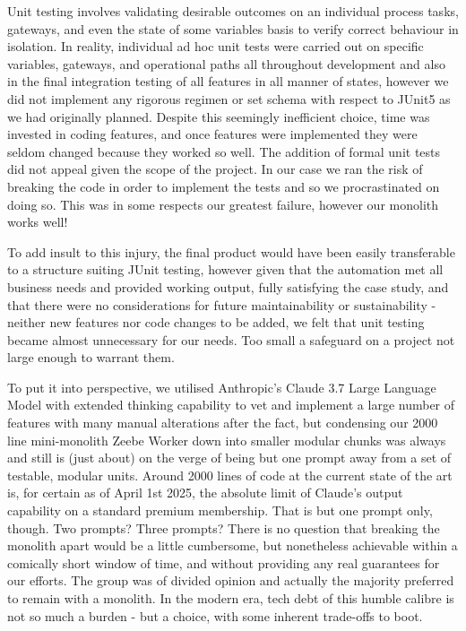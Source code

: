 \documentclass[14pt,a4paper]{article}
\begin{document}
Unit testing involves validating desirable outcomes on an individual process tasks, gateways, and even the state of some variables basis to verify correct behaviour in isolation. In reality, individual ad hoc unit tests were carried out on specific variables, gateways, and operational paths all throughout development and also in the final integration testing of all features in all manner of states, however we did not implement any rigorous regimen or set schema with respect to JUnit5 as we had originally planned. Despite this seemingly inefficient choice, time was invested in coding features, and once features were implemented they were seldom changed because they worked so well. The addition of formal unit tests did not appeal given the scope of the project. In our case we ran the risk of breaking the code in order to implement the tests and so we procrastinated on doing so. This was in some respects our greatest failure, however our monolith works well!

To add insult to this injury, the final product would have been easily transferable to a structure suiting JUnit testing, however given that the automation met all business needs and provided working output, fully satisfying the case study, and that there were no considerations for future maintainability or sustainability - neither new features nor code changes to be added, we felt that unit testing became almost unnecessary for our needs. Too small a safeguard on a project not large enough to warrant them.

To put it into perspective, we utilised Anthropic's Claude 3.7 Large Language Model with extended thinking capability to vet and implement a large number of features with many manual alterations after the fact, but condensing our 2000 line mini-monolith Zeebe Worker down into smaller modular chunks was always and still is (just about) on the verge of being but one prompt away from a set of testable, modular units. Around 2000 lines of code at the current state of the art is, for certain as of April 1st 2025, the absolute limit of Claude's output capability on a standard premium membership. That is but one prompt only, though. Two prompts? Three prompts? There is no question that breaking the monolith apart would be a little cumbersome, but nonetheless achievable within a comically short window of time, and without providing any real guarantees for our efforts. The group was of divided opinion and actually the majority preferred to remain with a monolith. In the modern era, tech debt of this humble calibre is not so much a burden - but a choice, with some inherent trade-offs to boot.
\end{document}
